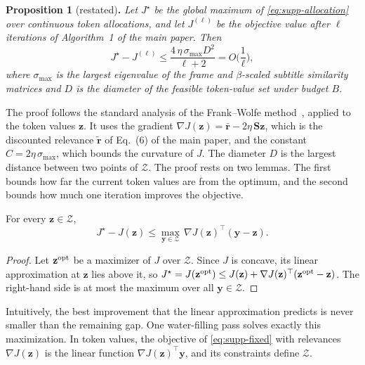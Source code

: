 \smallskip
\noindent\textbf{Proposition 1} (restated)\textbf{.} \textit{Let $J^\star$ be the global maximum of \cref{eq:supp-allocation} over continuous token allocations, and let $J^{(\ell)}$ be the objective value after $\ell$ iterations of Algorithm~1 of the main paper. Then}
\begin{equation}
  J^\star-J^{(\ell)}\le\frac{4\,\eta\,\sigma_{\max}D^2}{\ell+2}=O\Big(\frac{1}{\ell}\Big) ,
\label{eq:supp-rate}
\end{equation}
\textit{where $\sigma_{\max}$ is the largest eigenvalue of the frame and $\beta$-scaled subtitle similarity matrices and $D$ is the diameter of the feasible token-value set under budget $B$.}

\smallskip
The proof follows the standard analysis of the Frank--Wolfe method~\cite{jaggi2013}, applied to the token values $\mathbf z$. It uses the gradient $\nabla J(\mathbf z)=\bar{\mathbf r}-2\eta\,\mathbf S\mathbf z$, which is the discounted relevance $\tilde{\mathbf r}$ of Eq.~(6) of the main paper, and the constant $C=2\eta\,\sigma_{\max}$, which bounds the curvature of $J$. The diameter $D$ is the largest distance between two points of $\mathcal Z$. The proof rests on two lemmas. The first bounds how far the current token values are from the optimum, and the second bounds how much one iteration improves the objective.

\begin{lemma}
\label{lem:gap}
For every $\mathbf z\in\mathcal Z$,
\begin{equation}
  J^\star-J(\mathbf z)\le\max_{\mathbf y\in\mathcal Z}\,\nabla J(\mathbf z)^{\top}(\mathbf y-\mathbf z) .
\label{eq:supp-lem-gap}
\end{equation}
\end{lemma}
\begin{proof}
Let $\mathbf z^{\rm opt}$ be a maximizer of $J$ over $\mathcal Z$. Since $J$ is concave, its linear approximation at $\mathbf z$ lies above it, so $J^\star=J(\mathbf z^{\rm opt})\le J(\mathbf z)+\nabla J(\mathbf z)^{\top}(\mathbf z^{\rm opt}-\mathbf z)$. The right-hand side is at most the maximum over all $\mathbf y\in\mathcal Z$.
\end{proof}

\noindent Intuitively, the best improvement that the linear approximation predicts is never smaller than the remaining gap. One water-filling pass solves exactly this maximization. In token values, the objective of \cref{eq:supp-fixed} with relevances $\nabla J(\mathbf z)$ is the linear function $\nabla J(\mathbf z)^{\top}\mathbf y$, and its constraints define $\mathcal Z$.

